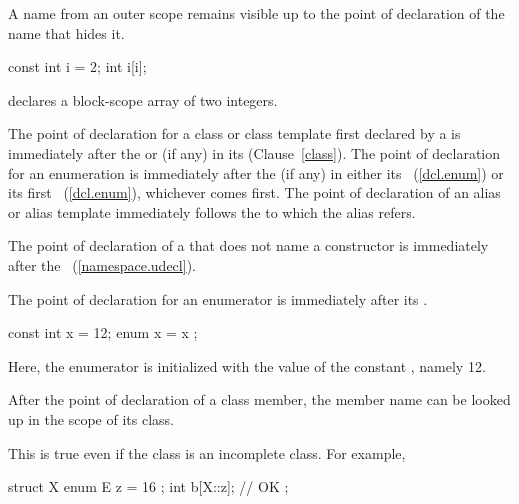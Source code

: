 \pnum
\begin{note}
%
A name from an outer scope remains visible up
to the point of declaration of the name that hides it. \begin{example}

\begin{codeblock}
const int  i = 2;
{ int  i[i]; }
\end{codeblock}

declares a block-scope array of two integers. \end{example} \end{note}

\pnum
The point of declaration for a class or class template first declared by a
 is immediately after the  or
 (if any) in its 
(Clause~\ref{class}). The point of declaration for an enumeration is
immediately after the  (if any) in either its
~(\ref{dcl.enum}) or its first
~(\ref{dcl.enum}), whichever comes first.
The point of declaration of an alias or alias template immediately
follows the  to which the
alias refers.

\pnum
The point of declaration of a  that does not name a
constructor is immediately after the ~(\ref{namespace.udecl}).

\pnum
{}%
The point of declaration for an enumerator is immediately after its
. \begin{example}

\begin{codeblock}
const int x = 12;
{ enum { x = x }; }
\end{codeblock}

Here, the enumerator  is initialized with the value of the
constant , namely 12. \end{example}

\pnum
After the point of declaration of a class member, the member name can be
looked up in the scope of its class. \begin{note}
%
This is true even if the class is an incomplete class. For example,

\begin{codeblock}
struct X {
  enum E { z = 16 };
  int b[X::z];      // OK
};
\end{codeblock}
\end{note}

